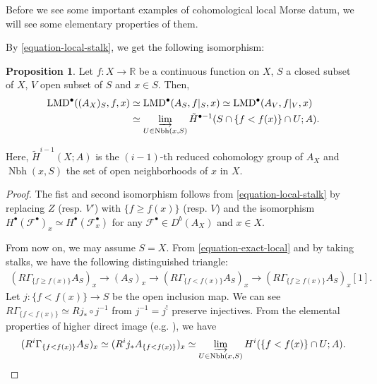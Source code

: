 \documentclass[a4paper,dvipdfmx,reqno,12pt]{amsart}
\theoremstyle{definition}
\newtheorem{proposition}[theorem]{Proposition}
\newcommand{\opn}[1]{\operatorname{#1}}
\numberwithin{equation}{section}
\begin{document}
Before we see some important examples of cohomological
local Morse datum, we will see some elementary
properties of them.







By \cref{equation-local-stalk}, we get the following
isomorphism:

\begin{proposition} \label{prop-local-morse-data}
Let $f\colon X\to \mathbb{R}$ be a continuous function
on $X$, $S$ a closed subset
of $X$, $V$ open subset of $S$ and $x\in S$. Then,
\begin{align} 
\opn{LMD}^{\bullet}((A_{X})_S,f,x
) &\simeq  
\opn{LMD}^{\bullet}(A_S,f|_S,x)
\simeq \opn{LMD}^{\bullet}(A_{V},f|_V,x) \\
&\simeq \varinjlim_{U\in\opn{Nbh}(x,S)} 
\tilde{H}^{\bullet-1}(S\cap \{f<f(x)\}\cap U;A).
\end{align}

Here, $\tilde{H}^{i-1}(X;A)$ is the $(i-1)$-th reduced cohomology 
group
of $A_X$ and $\opn{Nbh}(x,S)$ the set of open neighborhoods
of $x$ in $X$. 
\end{proposition}
\begin{proof}
The fist and second isomorphism follows from
\cref{equation-local-stalk} by 
replacing $Z$ (resp. $V'$) with 
$\{f\geq f(x)\}$ (resp. $V$) and the isomorphism
$H^{\bullet}(\mathcal{F}^{\bullet})_x\simeq 
H^{\bullet}(\mathcal{F}^{\bullet}_x)$ for any 
$\mathcal{F}^{\bullet}\in D^{b}(A_X)$ and $x\in X$.

From now on, we may assume $S=X$.
From \cref{equation-exact-local} and by taking stalks,
we have the following distinguished triangle:
\begin{align}
(R\Gamma_{\{f\geq f(x)\}}A_S)_x \to 
(A_S)_x\to 
(R\Gamma_{\{f<f(x)\}}A_S)_x\to 
(R\Gamma_{\{f\geq f(x)\}}A_S)_x[1].
\end{align}
Let $j\colon \{f<f(x)\}\to S$ be the open inclusion map. 
We can see 
$R\Gamma_{\{f< f(x)\}}\simeq Rj_*\circ j^{-1}$
from $j^{-1}=j^{!}$ preserve injectives.
From the elemental properties of higher direct image
(e.g. \cite[II. Proposition 5.11]{iversenCohomologySheaves1986a}),
we have
\begin{align}
(R^{i}\Gamma_{\{f< f(x)\}}A_S)_x\simeq 
(R^{i}j_* A_{\{f<f(x)\}})_x \simeq 
\varinjlim_{U\in \opn{Nbh}(x,S)} 
H^{i}(\{f<f(x)\}\cap U;A).
\end{align}
\end{proof}
\end{document}
